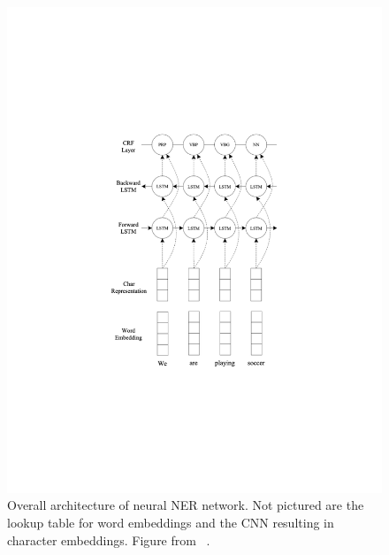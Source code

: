 \begin{figure}[h]
    \centering
    \begin{minipage}[t]{0.5\textwidth}
    	\centering
    	\includegraphics[width=.95\linewidth]{LatexDiss/figures/blstmcrf.pdf}
    	\caption{Overall architecture of neural NER network. Not pictured are the lookup table for word embeddings and the CNN resulting in character embeddings. Figure from ~\citep{DBLP:conf/acl/MaH16}.} %
    	\label{fig:blstmcrf}
    \end{minipage}\hfill
    \begin{minipage}[t]{0.5\textwidth}
    	\centering

\end{minipage}
\end{figure}
